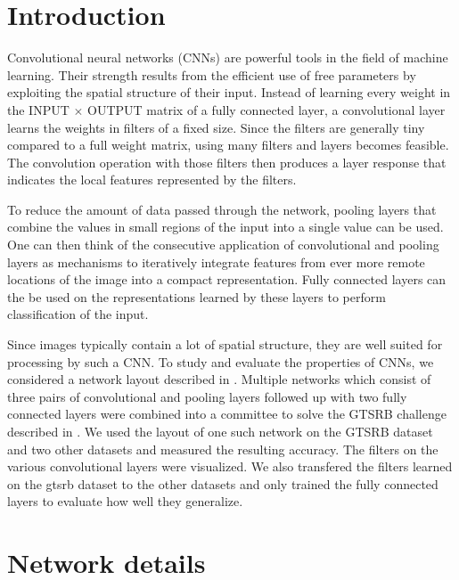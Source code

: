\documentclass[11pt, a4paper]{article}
\begin{document}
\newpage
\section{Introduction}
Convolutional neural networks (CNNs) are powerful tools in the field of machine learning. Their strength results from the efficient use of free parameters by exploiting the spatial structure of their input. Instead of learning every weight in the INPUT $\times$ OUTPUT matrix of a fully connected layer, a convolutional layer learns the weights in filters of a fixed size. Since the filters are generally tiny compared to a full weight matrix, using many filters and layers becomes feasible. The convolution operation with those filters then produces a layer response that indicates the local features represented by the filters.

To reduce the amount of data passed through the network, pooling layers that combine the values in small regions of the input into a single value can be used. One can then think of the consecutive application of convolutional and pooling layers as mechanisms to iteratively integrate features from ever more remote locations of the image into a compact representation. Fully connected layers can the be used on the representations learned by these layers to perform classification of the input.

Since images typically contain a lot of spatial structure, they are well suited for processing by such a CNN. To study and evaluate the properties of CNNs, we considered a network layout described in \cite{multi-column-neural-network-gtsrb}. Multiple networks which consist of three pairs of convolutional and pooling layers followed up with two fully connected layers were combined into a committee to solve the GTSRB challenge described in \cite{gtsrb}. We used the layout of one such network on the GTSRB dataset and two other datasets and measured the resulting accuracy. The filters on the various convolutional layers were visualized. We also transfered the filters learned on the gtsrb dataset to the other datasets and only trained the fully connected layers to evaluate how well they generalize.

\section{Network details}
\end{document}

